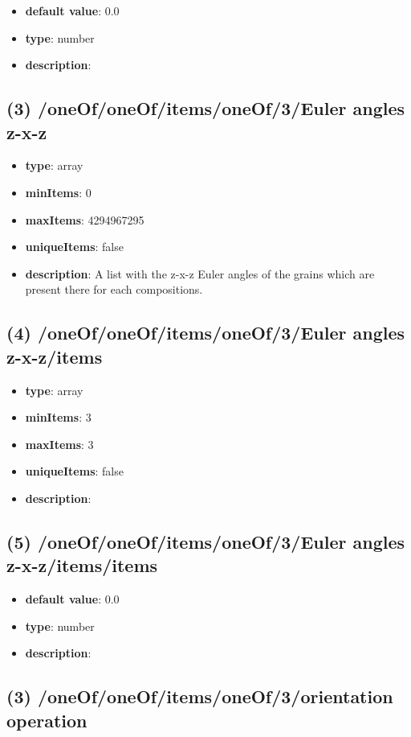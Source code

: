 \begin{itemize}[leftmargin=6em]\item {\bf default value}: 0.0
\item {\bf type}: number
\item {\bf description}: 
\end{itemize}\subsection{(3) /oneOf/oneOf/items/oneOf/3/Euler angles z-x-z}
\begin{itemize}[leftmargin=3em]\item {\bf type}: array
\item {\bf minItems}: 0
\item {\bf maxItems}: 4294967295
\item {\bf uniqueItems}: false
\item {\bf description}: A list with the z-x-z Euler angles of the grains which are present there for each compositions.
\end{itemize}\subsection{(4) /oneOf/oneOf/items/oneOf/3/Euler angles z-x-z/items}
\begin{itemize}[leftmargin=4em]\item {\bf type}: array
\item {\bf minItems}: 3
\item {\bf maxItems}: 3
\item {\bf uniqueItems}: false
\item {\bf description}: 
\end{itemize}\subsection{(5) /oneOf/oneOf/items/oneOf/3/Euler angles z-x-z/items/items}
\begin{itemize}[leftmargin=5em]\item {\bf default value}: 0.0
\item {\bf type}: number
\item {\bf description}: 
\end{itemize}\subsection{(3) /oneOf/oneOf/items/oneOf/3/orientation operation}
